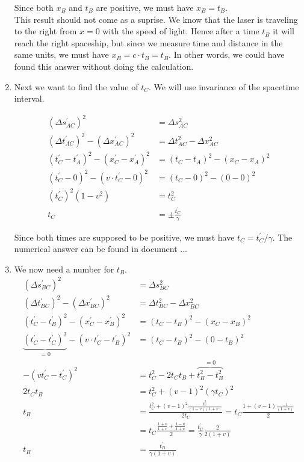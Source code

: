 \documentclass[a4paper,10pt,english]{article}
\begin{document}
\begin{enumerate}
Since both $x_{B}$ and $t_{B}$ are positive, we must have $x_{B}=t_{B}$. 
\\
This result should not come as a suprise. We know that the laser is traveling to the right from $x=0$ with the speed of light. Hence after a time $t_{B}$ it will reach the right spaceship, but since we measure time and distance in the same units, we must have $x_{B}=c\cdot t_{B}=t_{B}$. In other words, we could have found this answer without doing the calculation.
\item Next we want to find the value of $t_{C}$. We will use invariance of the spacetime interval.

\begin{align*}
(\Delta s_{AC}^{\prime})^{2}&=\Delta s_{AC}^{2}\\
(\Delta t_{AC}^{\prime})^{2}-(\Delta x_{AC}^{\prime})^{2}&=\Delta t_{AC}^{2}-\Delta x_{AC}^{2}\\
(t_{C}^{\prime}-t_{A}^{\prime})^{2}-(x_{C}^{\prime}-x_{A}^{\prime})^{2}&=(t_{C}-t_{A})^{2}-(x_{C}-x_{A})^{2}\\
(t_{C}^{\prime}-0)^{2}-(v\cdot t_{C}^{\prime}-0)^{2}&=(t_{C}-0)^{2}-(0-0)^{2}\\
(t_{C}^{\prime})^{2}(1-v^{2})&=t_{C}^{2}\\
t_{C}&=\pm\frac{t_{C}^{\prime}}{\gamma}
\end{align*}

Since both times are supposed to be positive, we must have $t_{C}=t_{C}^{\prime}/\gamma$. The numerical answer can be found in document $\ldots$
\item We now need a number for $t_{B}$.
\begin{align*}
(\Delta s_{BC}^{\prime})^{2}&=\Delta s_{BC}^{2}\\
(\Delta t_{BC}^{\prime})^{2}-(\Delta x_{BC}^{\prime})^{2}&=\Delta t_{BC}^{2}-\Delta x_{BC}^{2}\\
(t_{C}^{\prime}-t_{B}^{\prime})^{2}-(x_{C}^{\prime}-x_{B}^{\prime})^{2}&=(t_{C}-t_{B})^{2}-(x_{C}-x_{B})^{2}\\
\underbrace{(t_{C}^{\prime}-t_{C}^{\prime})^{2}}_{=0}-(v\cdot t_{C}^{\prime}-t_{B}^{\prime})^{2}&=(t_{C}-t_{B})^{2}-(0-t_{B})^{2}\\
-(vt_{C}^{\prime}-t_{C}^{\prime})^{2}&=t_{C}^{2}-2t_{C}t_{B}+\overbrace{t_{B}^{2}-t_{B}^{2}}^{=0}\\
2t_{C}t_{B}&=t_{C}^{2}+(v-1)^{2}(\gamma t_{C})^{2}\\
t_{B}&=\frac{t_{C}^{2}+(v-1)^{2}\frac{t_{C}^{2}}{(1-v)(1+v)}}{2t_{C}}=t_{C}\frac{1+(v-1)\frac{-1}{(1+v)}}{2}\\
&=t_{C}\frac{\frac{1+v}{1+v}+\frac{1-v}{1+v}}{2}=\frac{t_{C}^{\prime}}{\gamma}\frac{2}{2(1+v)}\\
t_{B}&=\frac{t_{B}^{\prime}}{\gamma(1+v)}
\end{align*}


\end{enumerate}
\end{document}
